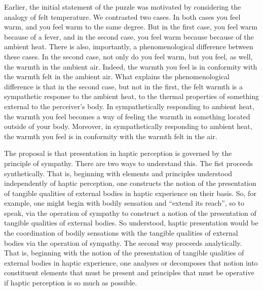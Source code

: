 Earlier, the initial statement of the puzzle was motivated by considering the analogy of felt temperature. We contrasted two cases. In both cases you feel warm, and you feel warm to the same degree. But in the first case, you feel warm because of a fever, and in the second case, you feel warm because because of the ambient heat. There is also, importantly, a phenomenological difference between these cases. In the second case, not only do you feel warm, but you feel, as well, the warmth in the ambient air. Indeed, the warmth you feel is in conformity with the warmth felt in the ambient air. What explains the phenomenological difference is that in the second case, but not in the first, the felt warmth is a sympathetic response to the ambient heat, to the thermal properties of something external to the perceiver's body. In sympathetically responding to ambient heat, the warmth you feel becomes a way of feeling the warmth in something located outside of your body. Moreover, in sympathetically responding to ambient heat, the warmth you feel is in conformity with the warmth felt in the air.

The proposal is that presentation in haptic perception is governed by the principle of sympathy. There are two ways to understand this. The fist proceeds synthetically. That is, beginning with elements and principles understood independently of haptic perception, one constructs the notion of the presentation of tangible qualities of external bodies in haptic experience on their basis. So, for example, one might begin with bodily sensation and ``extend its reach'', so to speak, via the operation of sympathy to construct a notion of the presentation of tangible qualities of external bodies. So understood, haptic presentation would be the coordination of bodily sensations with the tangible qualities of external bodies via the operation of sympathy. The second way proceeds analytically. That is, beginning with the notion of the presentation of tangible qualities of external bodies in haptic experience, one analyses or decomposes that notion into constituent elements that must be present and principles that must be operative if haptic perception is so much as possible. 

